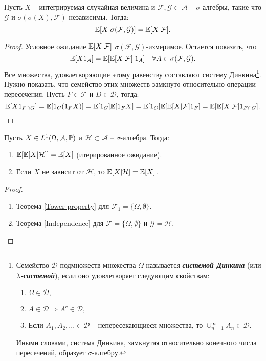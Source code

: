 \begin{thm} \label{Independence}
	Пусть $X$ -- интегрируемая случайная величина и $\mathcal{F}, \mathcal{G} \subset \mathcal{A}$ -- $\sigma$-алгебры, такие что $\mathcal{G}$ и $\sigma(\sigma(X), \mathcal{F})$ независимы. Тогда:
	\[ \mathbb{E}[X|\sigma(\mathcal{F}, \mathcal{G})] = \mathbb{E}[X|\mathcal{F}]. \]
\end{thm}
\begin{proof}
	Условное ожидание $\mathbb{E}[X|\mathcal{F}]$ $\sigma(\mathcal{F},\mathcal{G})$-измеримое. Остается показать, что
	\[ \mathbb{E}[X1_A]=\mathbb{E}[\mathbb{E}[X|\mathcal{F}]|1_A] \quad \forall A \in \sigma(\mathcal{F},\mathcal{G}). \]
	Все множества, удовлетворяющие этому равенству составляют систему Динкина\footnote{Семейство $\mathcal{D}$ подмножеств множества $\Omega$ называется \textbf{\textit{системой Динкина}} (или \textbf{\textit{$\lambda$-системой}}), если оно удовлетворяет следующим свойствам:
		\begin{enumerate}
			\item $\Omega \in \mathcal{D},$
			\item $A \in \mathcal{D} \Longrightarrow A^c \in \mathcal{D},$
			\item Если $A_1, A_2,... \in \mathcal{D}$ -- непересекающиеся множества, то $\cup_{n=1}^\infty A_n \in \mathcal{D}.$
		\end{enumerate}
		Иными словами, система Динкина, замкнутая относительно конечного числа пересечений, образует $\sigma$-алгебру.
		}. Нужно показать, что семейство этих множеств замкнуто относительно операции пересечения. Пусть $F \in \mathcal{F}$ и $D \in \mathcal{D}$, тогда:
	\[ \mathbb{E}[X1_{F \cap G}]=\mathbb{E}[1_G(1_FX)]=\mathbb{E}[1_G]\mathbb{E}[1_FX]=\mathbb{E}[1_G]\mathbb{E}[\mathbb{E}[X|\mathcal{F}]1_F]=\mathbb{E}[\mathbb{E}[X|\mathcal{F}]1_{F \cap G}]. \]
\end{proof}

\begin{crlr} \label{crlr1.15}
	Пусть $X \in L^1(\Omega, \mathcal{A}, \mathbb{P})$ и $\mathcal{H} \subset \mathcal{A}$ -- $\sigma$-алгебра. Тогда:
	\begin{enumerate}
		\item $\mathbb{E}[\mathbb{E}[X|\mathcal{H}]]=\mathbb{E}[X]$ (итерированное ожидание).
		\item Если $X$ не зависит от $\mathcal{H}$, то $\mathbb{E}[X|\mathcal{H}]=\mathbb{E}[X]$.
	\end{enumerate}
\end{crlr}
\begin{proof}
		\begin{enumerate}
			\item Теорема \ref{Tower property} для $\mathcal{F}_1=\{\Omega, \emptyset\}$.
			\item Теорема \ref{Independence} для $\mathcal{F}=\{\Omega, \emptyset\}$ и $\mathcal{G}=\mathcal{H}$.
		\end{enumerate}
\end{proof}

